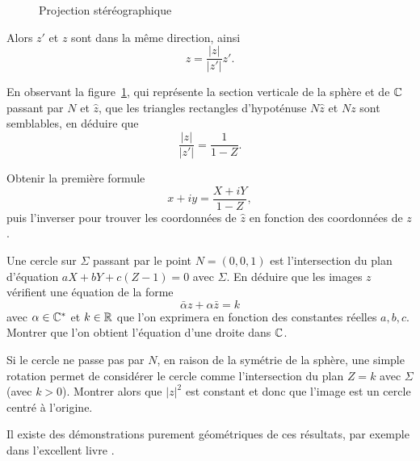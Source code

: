 \begin{exer}
\begin{figure}[ht]
\begin{center}
\shorthandon{!}\shorthandoff{:}
\caption{Projection stéréographique}\label{fig8}
\end{center}
\end{figure}

Alors $z'$ et $z$ sont dans la même direction, ainsi
\[z=\frac{\lvert z \rvert}{\lvert z' \rvert} z'.\]
\begin{MYenumerate}
\item En observant la figure~\ref{fig8}, qui représente la section verticale de la sphère et de $\mathbb{C}$ passant par $N$ et $\hat{z}$, que les triangles rectangles d'hypoténuse $N \hat{z}$ et $Nz$ sont semblables, en déduire que 
\[\frac{\lvert z \rvert}{\lvert z' \rvert} = \frac{1}{1-Z}.\]
\item Obtenir la première formule
\[x+iy = \frac{X+i Y}{1-Z},\]
puis l'inverser pour trouver les coordonnées de $\hat{z}$ en fonction des coordonnées de $z$.
\item Une cercle sur $\Sigma$ passant par le point $N=(0,0,1)$ est l'intersection du plan d'équation $a X + b Y +c(Z-1)=0$ avec $\Sigma$. En déduire que les images $z$ vérifient une équation de la forme
\[\bar{\alpha} z + \alpha \bar{z}=k \]
avec $\alpha  \in \mathbb{C}^\ast$ et $k \in \mathbb R$ que l'on exprimera en fonction des constantes réelles $a,b,c$. Montrer que l'on obtient l'équation d'une droite dans $\mathbb{C}$.
\item Si le cercle ne passe pas par $N$, en raison de la symétrie de la sphère, une simple rotation permet de considérer le cercle comme l'intersection du plan $Z=k$ avec $\Sigma$ (avec $k>0$). Montrer alors que $\lvert z\rvert ^2$ est constant et donc que l'image est un cercle centré à l'origine.  
\end{MYenumerate}
Il existe des démonstrations purement géométriques de ces résultats, par exemple dans l'excellent livre \cite{hilbert1983geometry}.
\end{exer}